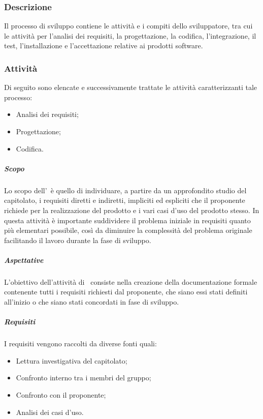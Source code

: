     \subsubsection{Descrizione} \label{subsubsection:Sviluppo_Descrizione}
    Il processo di sviluppo contiene le attività e i compiti dello sviluppatore, tra cui le attività per l’analisi dei requisiti, la progettazione, 
    la codifica, l’integrazione, il test, l’installazione e l’accettazione relative ai prodotti software.

    \subsubsection{Attività} \label{subsubsection:Attivita'}
    Di seguito sono elencate e successivamente trattate le attività caratterizzanti tale processo:
    \begin{itemize}
        \item Analisi dei requisiti;
        \item Progettazione;
        \item Codifica.
    \end{itemize}
    
        \paragraph{\docNameAdR} \label{paragraph:Analisi dei requisiti}
            \subparagraph{Scopo}
            Lo scopo dell’\docNameAdRLow\ è quello di individuare, a partire da un approfondito studio del capitolato, i requisiti diretti e indiretti,
            impliciti ed espliciti che il proponente richiede per la realizzazione del prodotto e i vari casi d'uso del prodotto stesso. In questa attività è importante
            suddividere il problema iniziale in requisiti quanto più elementari possibile, così da diminuire la complessità del problema originale
             facilitando il lavoro durante la fase di sviluppo.

            \subparagraph{Aspettative} \label{subparagraph:ADR_Aspettative}
            L’obiettivo dell’attività di \docNameAdRLow\ consiste nella creazione della documentazione formale contenente tutti i requisiti 
            richiesti dal proponente, che siano essi stati definiti all'inizio o che siano stati concordati in fase di sviluppo.

            \subparagraph{Requisiti} \label{subparagraph:Requisiti}
            I requisiti vengono raccolti da diverse fonti quali:
            \begin{itemize}
               \item Lettura investigativa del capitolato;
                \item Confronto interno tra i membri del gruppo;
                \item Confronto con il proponente;
                \item Analisi dei casi d'uso.
            \end{itemize}

